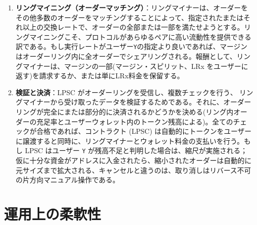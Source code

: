 \documentclass{article}
\makeatletter
\newenvironment{figurehere}
 {\def\@captype{figure}}
 {}
\makeatother
\begin{document}
\begin{multicols}{2}
\begin{enumerate}
\begin{center}
\begin{figurehere}

\caption{ループリング取引プロセス}
\label{fig:process}
\end{figurehere}
\end{center}


\item \textbf{リングマイニング（オーダーマッチング）}：リングマイナーは、オーダーをその他多数のオーダーをマッチングすることによって、指定されたまたはそれ以上の交換レートで、オーダーの全部または一部を満たせようとする。リングマイニングこそ、プロトコルがあらゆるペアに高い流動性を提供できる訳である。もし実行レートがユーザー\verb|Y|の指定より良いであれば、マージンはオーダーリング内に全オーダーでシェアリングされる。報酬として、リングマイナーは、マージンの一部(マージン・スピリット、LRx をユーザーに返す)を請求するか、または単にLRx料金を保留する。

\item \textbf{検証と決済}：LPSC がオーダーリングを受信し、複数チェックを行う、 リングマイナーから受け取ったデータを検証するためである。それに、オーダーリングが完全にまたは部分的に決済されるかどうかを決める(リング内オーダーの充足率とユーザーウォレット内のトークン残高による)。全てのチェックが合格であれば、コントラクト (LPSC) は自動的にトークンをユーザーに譲渡すると同時に、リングマイナーとウォレット料金の支払いを行う。もし LPSC はユーザー \verb|Y| が残高不足と判明した場合は、縮尺が実施される；仮に十分な資金がアドレスに入金されたら、縮小されたオーダーは自動的に元サイズまで拡大される、キャンセルと違うのは、取り消しはリバース不可の片方向マニュアル操作である。

\end{enumerate}





%
%
%


\section{運用上の柔軟性\label{sec:business_model}}


\end{multicols}
\end{document}

